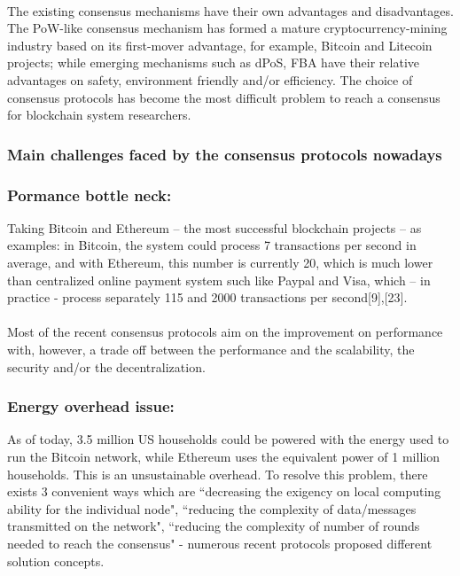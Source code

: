\documentclass[doublespacing]{bmcart}
\begin{document}
\begin{CJK*}{UTF8}{gbsn}
\paragraph{} The existing consensus mechanisms have their own advantages and disadvantages. The PoW-like consensus mechanism has formed a mature cryptocurrency-mining industry based on its first-mover advantage, for example, Bitcoin and Litecoin projects; while emerging mechanisms such as dPoS, FBA have their relative advantages on safety, environment friendly and/or efficiency. The choice of consensus protocols has become the most difficult problem to reach a consensus for blockchain system researchers.
\subsubsection{Main challenges faced by the consensus protocols nowadays}
\subsubsection*{Pormance bottle neck: }
Taking Bitcoin and Ethereum – the most successful blockchain projects – as examples: in Bitcoin, the system could process 7 transactions per second in average, and with Ethereum, this number is currently 20, which is much lower than centralized online payment system such like Paypal and Visa, which – in practice -  process separately 115 and 2000 transactions per second[9],[23].
\paragraph{}
	Most of the recent consensus protocols aim on the improvement on performance with, however, a trade off between the performance and the scalability, the security and/or the decentralization. 
\subsubsection*{Energy overhead issue:}	 As of today, 3.5 million US households could be powered with the energy used to run the Bitcoin network, while Ethereum uses the equivalent power of 1 million households. This is an unsustainable overhead. To resolve this problem, there exists 3 convenient ways which are ``decreasing the exigency on local computing ability for the individual node", ``reducing the complexity of data/messages transmitted on the network", ``reducing the complexity of number of rounds needed to reach the consensus" - numerous recent protocols proposed different solution concepts.

\end{CJK*}
\end{document}
